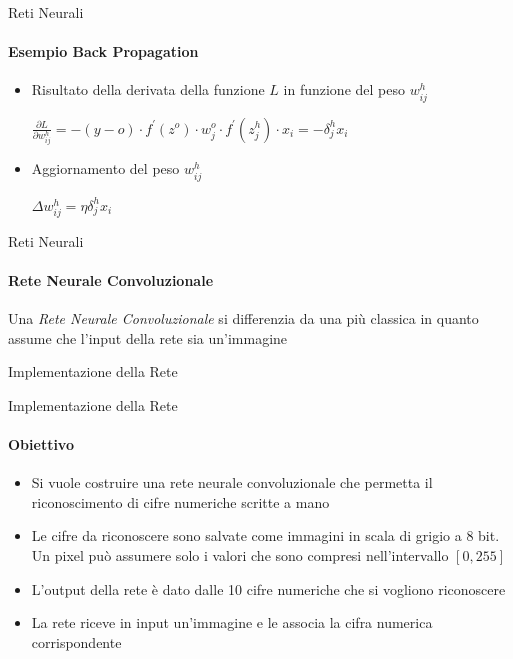 \documentclass[
 ]{beamer}
\begin{document}
\begin{frame}{Reti Neurali}
    \framesubtitle{Esempio Back Propagation}
    \begin{itemize} [<+->]
        \setlength\itemsep{3em}
        \item \large Risultato della derivata della funzione $L$ in funzione del peso $w_{ij}^{h}$
        \bigskip 
        \begin{center}
         \large $ \frac{\partial L}{\partial w_{ij}^{h}} =  -(y - o) \cdot f^{\prime}(z^{o}) \cdot w_j^{o} \cdot f^{\prime}(z_j^{h}) \cdot x_i = -\delta_j^{h}x_i$         
         \end{center}
         \item \large Aggiornamento del peso $w_{ij}^{h}$
         \bigskip
         \begin{center}
         \large $ \Delta w_{ij}^{h} = \eta\delta_j^{h}x_i$         
         \end{center}       
    \end{itemize}
\end{frame}

\begin{frame}{Reti Neurali}
    \framesubtitle{Rete Neurale Convoluzionale}  
    Una \emph{Rete Neurale Convoluzionale} si differenzia da una più classica in quanto assume che l'input della rete sia un'immagine
\end{frame}   

\begin{frame}[c]
  \centering
  \bigskip \bigskip    
  \Huge Implementazione della Rete
\end{frame}

\begin{frame}{Implementazione della Rete}
    \framesubtitle{Obiettivo}
    \begin{itemize} [<+->]
        \setlength\itemsep{2em}
        \item \large Si vuole costruire una rete neurale convoluzionale che permetta il riconoscimento di cifre numeriche scritte a mano
        \item \large Le cifre da riconoscere sono salvate come immagini in scala di grigio a 8 bit. Un pixel può assumere solo i valori che sono compresi nell'intervallo $[0,255]$
        \item \large L'output della rete è dato dalle 10 cifre numeriche che si vogliono riconoscere
        \item \large La rete riceve in input un'immagine e le associa la cifra numerica corrispondente
    \end{itemize}
\end{frame}
\end{document}
